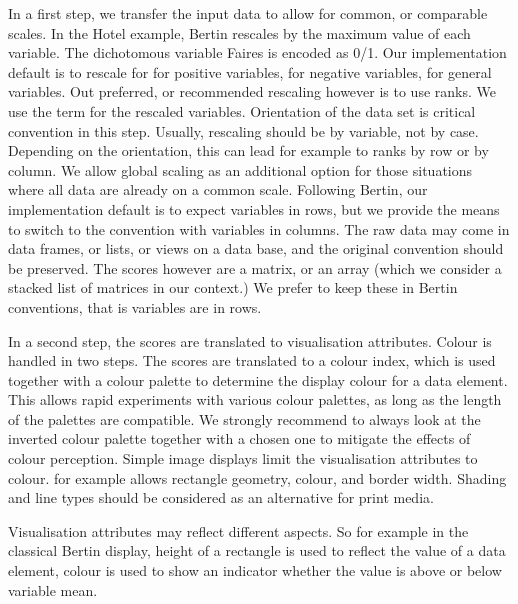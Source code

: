 \documentclass[nogin, dvips,12pt,a4paper,twoside]{amsart}
\begin{document}
In a first step, we transfer the input data to allow for  common, or comparable scales. In the Hotel example, Bertin rescales by the maximum value of each variable. The dichotomous variable Faires is encoded as 0/1. Our  implementation default is to rescale for   for positive variables,   for negative variables,   for general variables. Out preferred, or recommended rescaling however is to use ranks. We use the term  for the rescaled variables. Orientation of the data set is critical convention in this step. Usually, rescaling should be by variable, not by case. Depending on the orientation, this can lead for example to ranks by row or by column. We allow global scaling as an additional option for those situations where all data are already on a common scale. Following Bertin, our  implementation default is to expect variables in rows, but we provide the means to switch to the \R{} convention with variables in columns. The raw data may come in data frames, or lists, or views on a data base, and the original convention should be preserved. The scores however are a matrix, or an array (which we consider a stacked list of matrices in our context.) We prefer to keep these in Bertin conventions, that is variables are in rows.

In a second step, the scores are translated to visualisation attributes.  Colour is handled in two steps. The scores are translated to  a colour index, which is used together with a colour palette to determine the display colour for a data element. This allows rapid experiments with various colour palettes, as long as the length of the palettes are compatible. We strongly recommend to always look at the inverted colour palette together with a chosen one  to mitigate the effects of colour  perception. Simple image displays limit the  visualisation attributes to colour.  for example allows rectangle geometry, colour, and border width. Shading and line types should be considered as an alternative for print media. 

Visualisation attributes may reflect different aspects. So for example in the classical Bertin display, height of a rectangle is used to reflect the value of a data element, colour is used to show an indicator whether the value is above or below variable mean.
\end{document}
